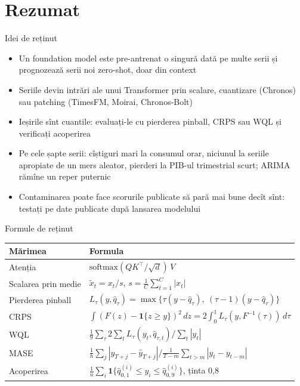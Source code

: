 \section{Rezumat}

\begin{frame}{Idei de reținut}
\itemsize{\small}
\begin{itemize}
    \item Un foundation model este pre-antrenat o singură dată pe multe serii și prognozează serii noi zero-shot, doar din context
    \item Seriile devin intrări ale unui Transformer prin scalare, cuantizare (Chronos) sau patching (TimesFM, Moirai, Chronos-Bolt)
    \item Ieșirile sînt cuantile: evaluați-le cu pierderea pinball, CRPS sau WQL și verificați acoperirea
    \item Pe cele șapte serii: cîștiguri mari la consumul orar, niciunul la seriile apropiate de un mers aleator, pierderi la PIB-ul trimestrial scurt; ARIMA rămîne un reper puternic
    \item Contaminarea poate face scorurile publicate să pară mai bune decît sînt: testați pe date publicate după lansarea modelului
\end{itemize}
\end{frame}

\begin{frame}{Formule de reținut}
\itemsize{\small}
{\renewcommand{\arraystretch}{1.4}\begin{center}
\footnotesize
\begin{tabular}{ll}
\toprule
\textbf{Mărimea} & \textbf{Formula} \\
\midrule
Atenția & $\text{softmax}(QK^\top/\sqrt{d})\,V$ \\
Scalarea prin medie & $\tilde x_t = x_t/s$, \quad $s = \frac1C\sum_{t=1}^{C}|x_t|$ \\
Pierderea pinball & $L_\tau(y, \hat q_\tau) = \max\{\tau(y - \hat q_\tau),\ (\tau - 1)(y - \hat q_\tau)\}$ \\
CRPS & $\int (F(z) - \mathbf{1}\{z \ge y\})^2\,dz = 2\int_0^1 L_\tau(y, F^{-1}(\tau))\,d\tau$ \\
WQL & $\frac{1}{9}\sum_{\tau} 2\sum_t L_{\tau}(y_t, \hat q_{\tau,t}) \big/ \sum_t |y_t|$ \\
MASE & $\frac1h\sum_j |y_{T+j} - \hat y_{T+j}| \Big/ \frac{1}{T-m}\sum_{t>m}|y_t - y_{t-m}|$ \\
Acoperirea & $\frac1n\sum_i \mathbf{1}\{\hat q_{0{,}1}^{(i)} \le y_i \le \hat q_{0{,}9}^{(i)}\}$, ținta 0,8 \\
\bottomrule
\end{tabular}
\end{center}
}
\end{frame}


